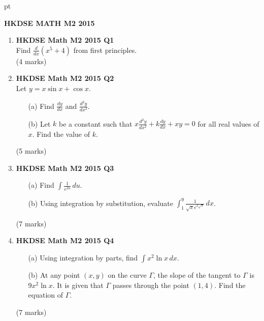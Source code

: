 \documentclass[12pt]{article}
\begin{document}
 pt
\begin{center}
	{\large \bf HKDSE MATH M2 2015}\\
	\vspace{2 mm}

\end{center}
\vspace{0.05cm}

\begin{enumerate}
	\item \textbf{HKDSE Math M2 2015 Q1}\\
	Find $\displaystyle \frac{d}{dx} (x^5+4)$ from first principles. \\(4 marks)

	\item \textbf{HKDSE Math M2 2015 Q2}\\
	Let $y=x\sin{x} + \cos{x}$.  
	\begin{enumerate}
		\item [(a)]Find $\displaystyle\frac{dy}{dx}$ and $\displaystyle\frac{d^2y}{dx^2}$.
		\item [(b)]Let $k$ be a constant such that $x\displaystyle\frac{d^2y}{dx^2} + k\displaystyle\frac{dy}{dx} + xy = 0$ for all real values of $x$. Find the value of $k$.
	\end{enumerate}
	(5 marks)

	\item \textbf{HKDSE Math M2 2015 Q3}
	\begin{enumerate}
		\item [(a)]Find $\displaystyle\int \frac{1}{e^{2u}} \,du$. 
		\item [(b)]Using integration by substitution, evaluate $\displaystyle\int_1^9 \frac{1}{\sqrt{x}e^{2\sqrt{x}}}\,dx$. 
	\end{enumerate}
	(7 marks)

	\item \textbf{HKDSE Math M2 2015 Q4}
	\begin{enumerate}
		\item [(a)]Using integration by parts, find $\displaystyle\int x^2 \ln{x} \,dx $. 
		\item [(b)]At any point $(x,y)$ on the curve $\Gamma $, the slope of the tangent to $\Gamma$ is $9x^2 \ln{x}$. It is given that $\Gamma$ passes through the point $(1,4)$. Find the equation of $\Gamma$.  
	\end{enumerate}
	(7 marks)


\end{enumerate}
\end{document}
